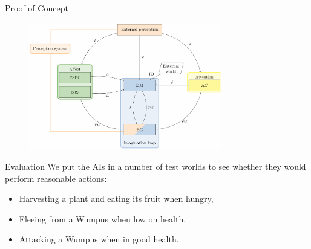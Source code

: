 \documentclass[final,hyperref={pdfpagelabels=false}]{beamer}
\begin{document}
\begin{frame}
\begin{columns}[t]
\begin{column}{.45\textwidth}
\begin{block}{Proof of Concept}
                $~$
                
                \begin{figure}
                	\centering
                	\includegraphics[width=0.75\textwidth]{figures/architecture.png}
                \end{figure}
            \end{block}
            
            \begin{block}{Evaluation}
                We put the AIs in a number of test worlds to see whether they would perform reasonable actions:
                \begin{itemize}
                    \item Harvesting a plant and eating its fruit when hungry,
                    \item Fleeing from a Wumpus when low on health.
                    \item Attacking a Wumpus when in good health.
                \end{itemize}
            \end{block}
            

\end{column}
\end{columns}
\end{frame}
\end{document}
